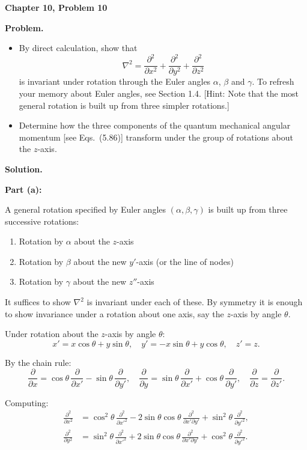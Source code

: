 \documentclass[12pt]{article}
\begin{document}
\begin{center}
{\Large\bfseries Chapter 10, Problem 10}
\end{center}

\noindent\textbf{Problem.}
\begin{itemize}
\item[a)] By direct calculation, show that
\[
\nabla^2 = \frac{\partial^2}{\partial x^2} + \frac{\partial^2}{\partial y^2} + \frac{\partial^2}{\partial z^2}
\]
is invariant under rotation through the Euler angles $\alpha$, $\beta$ and $\gamma$. To refresh your memory about Euler angles, see Section 1.4. [Hint: Note that the most general rotation is built up from three simpler rotations.]

\item[b)] Determine how the three components of the quantum mechanical angular momentum [see Eqs.~(5.86)] transform under the group of rotations about the $z$-axis.
\end{itemize}

\bigskip
\noindent\textbf{Solution.}

\noindent\textbf{Part (a):}

A general rotation specified by Euler angles $(\alpha, \beta, \gamma)$ is built up from three successive rotations:
\begin{enumerate}
\item Rotation by $\alpha$ about the $z$-axis
\item Rotation by $\beta$ about the new $y'$-axis (or the line of nodes)
\item Rotation by $\gamma$ about the new $z''$-axis
\end{enumerate}

It suffices to show $\nabla^2$ is invariant under each of these. By symmetry it is enough to show invariance under a rotation about one axis, say the $z$-axis by angle $\theta$.

Under rotation about the $z$-axis by angle $\theta$:
\[
x' = x\cos\theta + y\sin\theta, \quad y' = -x\sin\theta + y\cos\theta, \quad z' = z.
\]

By the chain rule:
\[
\frac{\partial}{\partial x} = \cos\theta\,\frac{\partial}{\partial x'} - \sin\theta\,\frac{\partial}{\partial y'}, \quad
\frac{\partial}{\partial y} = \sin\theta\,\frac{\partial}{\partial x'} + \cos\theta\,\frac{\partial}{\partial y'}, \quad
\frac{\partial}{\partial z} = \frac{\partial}{\partial z'}.
\]

Computing:
\begin{align*}
\frac{\partial^2}{\partial x^2} &= \cos^2\theta\,\frac{\partial^2}{\partial x'^2} - 2\sin\theta\cos\theta\,\frac{\partial^2}{\partial x'\partial y'} + \sin^2\theta\,\frac{\partial^2}{\partial y'^2}, \\[6pt]
\frac{\partial^2}{\partial y^2} &= \sin^2\theta\,\frac{\partial^2}{\partial x'^2} + 2\sin\theta\cos\theta\,\frac{\partial^2}{\partial x'\partial y'} + \cos^2\theta\,\frac{\partial^2}{\partial y'^2}.
\end{align*}
\end{document}
